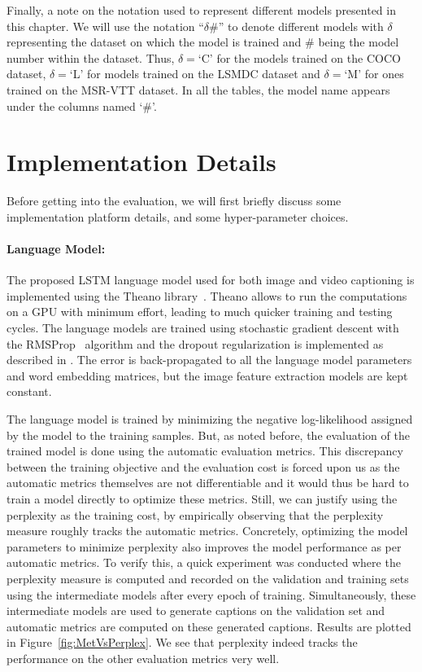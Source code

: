 Finally, a note on the notation used to represent different models presented
in this chapter.
We will use the notation ``$\delta\#$'' to denote different models with $\delta$
representing the dataset on which the model is trained and $\#$ being the model
number within the dataset.
Thus, $\delta=$`C' for the models trained on the COCO dataset, $\delta=$`L' for
models trained on the LSMDC dataset and $\delta=$`M' for ones trained on the
MSR-VTT dataset.
In all the tables, the model name appears under the columns named `\#'.

\section{Implementation Details}
Before getting into the evaluation, we will first briefly discuss some
implementation platform details, and some hyper-parameter choices.
\paragraph*{Language Model:} The proposed LSTM language model used
for both image and video captioning is implemented using the Theano
library~\cite{Bastien-Theano-2012}.
Theano allows to run the computations on a GPU with minimum effort, leading to
much quicker training and testing cycles.
The language models are trained using stochastic gradient descent with the
RMSProp~\cite{rmspropTielman} algorithm and the dropout regularization is
implemented as described in \cite{ZarembaSV14}.
The error is back-propagated to all the language model parameters and word
embedding matrices, but the image feature extraction models are kept constant.
%

The language model is trained by minimizing the negative log-likelihood assigned
by the model to the training samples.
But, as noted before, the evaluation of the trained model is done using the automatic
evaluation metrics.
This discrepancy between the training objective and the evaluation cost is
forced upon us as the automatic metrics themselves are not differentiable and it
would thus be hard to train a model directly to optimize these metrics.
Still, we can justify using the perplexity as the training cost, by empirically
observing that the perplexity measure roughly tracks the automatic metrics.
Concretely, optimizing the model parameters to minimize perplexity also improves the
model performance as per automatic metrics.
To verify this, a quick experiment was conducted where the perplexity measure is
computed and recorded on the validation and training sets using the intermediate
models after every epoch of training.
Simultaneously, these intermediate models are used to generate captions on the
validation set and automatic metrics are computed on these generated captions.
Results are plotted in Figure~\ref{fig:MetVsPerplex}.
We see that perplexity indeed tracks the performance on the other evaluation
metrics very well.

